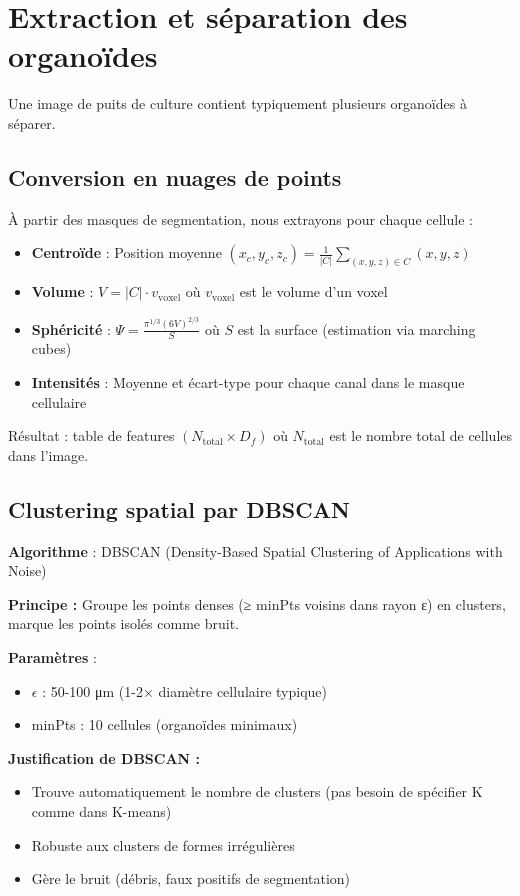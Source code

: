 \section{Extraction et séparation des organoïdes}

Une image de puits de culture contient typiquement plusieurs organoïdes à séparer.

\subsection{Conversion en nuages de points}

À partir des masques de segmentation, nous extrayons pour chaque cellule :
\begin{itemize}
    \item \textbf{Centroïde} : Position moyenne $(x_c, y_c, z_c) = \frac{1}{|C|}\sum_{(x,y,z) \in C} (x,y,z)$
    \item \textbf{Volume} : $V = |C| \cdot v_{\text{voxel}}$ où $v_{\text{voxel}}$ est le volume d'un voxel
    \item \textbf{Sphéricité} : $\Psi = \frac{\pi^{1/3}(6V)^{2/3}}{S}$ où $S$ est la surface (estimation via marching cubes)
    \item \textbf{Intensités} : Moyenne et écart-type pour chaque canal dans le masque cellulaire
\end{itemize}

Résultat : table de features $(N_{\text{total}} \times D_f)$ où $N_{\text{total}}$ est le nombre total de cellules dans l'image.

\subsection{Clustering spatial par DBSCAN}

\textbf{Algorithme} : DBSCAN (Density-Based Spatial Clustering of Applications with Noise)

\textbf{Principe :}
Groupe les points denses (≥ minPts voisins dans rayon ε) en clusters, marque les points isolés comme bruit.

\textbf{Paramètres} :
\begin{itemize}
    \item $\epsilon$ : 50-100 μm (1-2× diamètre cellulaire typique)
    \item minPts : 10 cellules (organoïdes minimaux)
\end{itemize}

\textbf{Justification de DBSCAN :}
\begin{itemize}
    \item Trouve automatiquement le nombre de clusters (pas besoin de spécifier K comme dans K-means)
    \item Robuste aux clusters de formes irrégulières
    \item Gère le bruit (débris, faux positifs de segmentation)
\end{itemize}

